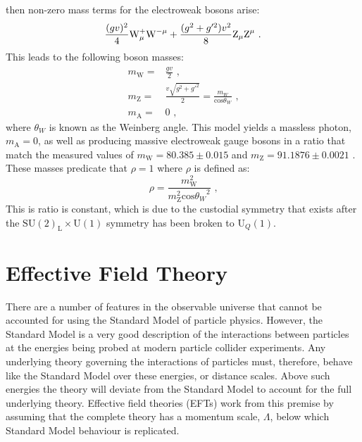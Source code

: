 %
\noindent then non-zero mass terms for the electroweak bosons arise:
%
\begin{equation}
\frac{(gv)^{2}}{4} \text{W}^{+}_{\mu} \text{W}^{-\mu} + \frac{(g^{2} + g'^{2})v^{2}}{8} \text{Z}_{\mu} \text{Z}^{\mu} \text{ .}\\
\end{equation}
%
\noindent This leads to the following boson masses:
%
\begin{equation}
\begin{aligned}
m_{\text{W}} = & \frac{gv}{2} \text{ ,} \\
m_{\text{Z}} = & \frac{v\sqrt{g^{2} + g'^{2}}}{2} = \frac{m_{W}}{\text{cos}{\theta_{W}}} \text{ ,} \\
m_{\text{A}} = & 0 \text{ ,}
\end{aligned}
\end{equation}
%
\noindent where $\theta_{W}$ is known as the Weinberg angle.  This model yields a massless photon, $m_{\text{A}} = 0$, as well as producing massive electroweak gauge bosons in a ratio that match the measured values of $m_{\text{W}} = 80.385 \pm 0.015$ and $m_{\text{Z}} = 91.1876 \pm 0.0021$ \cite{Beringer:1900zz}.  These masses predicate that $\rho = 1$ where $\rho$ is defined as:
%
\begin{equation}
\rho = \frac{m_{\text{W}}^{2}}{m_{\text{Z}}^{2}\text{cos}{\theta_{W}}^{2}} \text{ ,}
\label{equ:custodialsymmetry}
\end{equation}
%
\noindent This is ratio is constant, which is due to the custodial symmetry that exists after the $\text{SU}(2)_{\text{L}} \times \text{U}(1)$ symmetry has been broken to $\text{U}_{Q}(1)$.


\section{Effective Field Theory}
There are a number of features in the observable universe that cannot be accounted for using the Standard Model of particle physics.  However, the Standard Model is a very good description of the interactions between particles at the energies being probed at modern particle collider experiments.  Any underlying theory governing the interactions of particles must, therefore, behave like the Standard Model over these energies, or distance scales.  Above such energies the theory will deviate from the Standard Model to account for the full underlying theory.  Effective field theories (EFTs) work from this premise by assuming that the complete theory  has a momentum scale, $\Lambda$, below which Standard Model behaviour is replicated.  

